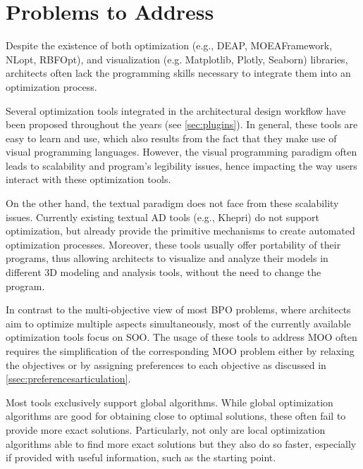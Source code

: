 	\section{Problems to Address}
	\label{sec:problemsaddress}
	
	Despite the existence of both optimization  (e.g., DEAP, MOEAFramework, NLopt, RBFOpt), and visualization (e.g. Matplotlib, Plotly, Seaborn) libraries, architects often lack the programming skills necessary to integrate them into an optimization process. 
	
	Several optimization tools integrated in the architectural design workflow have been proposed throughout the years (see \cref{sec:plugins}). In general, these tools are easy to learn and use, which also results from the fact that they make use of visual programming languages. However, the visual programming paradigm often leads to scalability and program's legibility issues, hence impacting the way users interact with these optimization tools. 
	
	On the other hand, the textual paradigm does not face from these scalability issues. Currently existing textual \ac{AD} tools (e.g., Khepri) do not support optimization, but already provide the primitive mechanisms to create automated optimization processes. Moreover, these tools usually offer portability of their programs, thus allowing architects to visualize and analyze their models in different 3D modeling and analysis tools, without the need to change the program.
	
	In contrast to the multi-objective view of most \ac{BPO} problems, where architects aim to optimize multiple aspects simultaneously, most of the currently available optimization tools focus on \ac{SOO}. The usage of these tools to address \ac{MOO} often requires the simplification of the corresponding \ac{MOO} problem either by relaxing the objectives or by assigning preferences to each objective as discussed in \cref{ssec:preferencesarticulation}.
	
	Most tools exclusively support global algorithms. While global optimization algorithms are good for obtaining close to optimal solutions, these often fail to provide more exact solutions. Particularly, not only are local optimization algorithms able to find more exact solutions but they also do so faster, especially if provided with useful information, such as the starting point.
	
	
